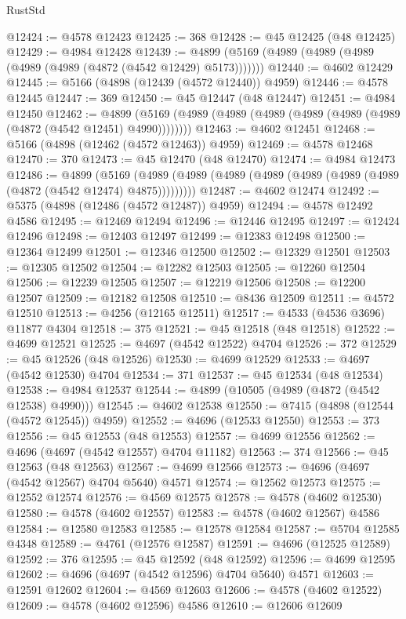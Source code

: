 \begin{lexlean}{RustStd}
\begin{coremodule}
@12424 := @4578 @12423
@12425 := 368
@12428 := @45 @12425 (@48 @12425)
@12429 := @4984 @12428
@12439 := @4899 (@5169 (@4989 (@4989 (@4989 (@4989 (@4989 (@4872 (@4542 @12429) @5173)))))))
@12440 := @4602 @12429
@12445 := @5166 (@4898 (@12439 (@4572 @12440)) @4959)
@12446 := @4578 @12445
@12447 := 369
@12450 := @45 @12447 (@48 @12447)
@12451 := @4984 @12450
@12462 := @4899 (@5169 (@4989 (@4989 (@4989 (@4989 (@4989 (@4989 (@4872 (@4542 @12451) @4990))))))))
@12463 := @4602 @12451
@12468 := @5166 (@4898 (@12462 (@4572 @12463)) @4959)
@12469 := @4578 @12468
@12470 := 370
@12473 := @45 @12470 (@48 @12470)
@12474 := @4984 @12473
@12486 := @4899
    (@5169 (@4989 (@4989 (@4989 (@4989 (@4989 (@4989 (@4989 (@4872 (@4542 @12474) @4875)))))))))
@12487 := @4602 @12474
@12492 := @5375 (@4898 (@12486 (@4572 @12487)) @4959)
@12494 := @4578 @12492 @4586
@12495 := @12469 @12494
@12496 := @12446 @12495
@12497 := @12424 @12496
@12498 := @12403 @12497
@12499 := @12383 @12498
@12500 := @12364 @12499
@12501 := @12346 @12500
@12502 := @12329 @12501
@12503 := @12305 @12502
@12504 := @12282 @12503
@12505 := @12260 @12504
@12506 := @12239 @12505
@12507 := @12219 @12506
@12508 := @12200 @12507
@12509 := @12182 @12508
@12510 := @8436 @12509
@12511 := @4572 @12510
@12513 := @4256 (@12165 @12511)
@12517 := @4533 (@4536 @3696) @11877 @4304
@12518 := 375
@12521 := @45 @12518 (@48 @12518)
@12522 := @4699 @12521
@12525 := @4697 (@4542 @12522) @4704
@12526 := 372
@12529 := @45 @12526 (@48 @12526)
@12530 := @4699 @12529
@12533 := @4697 (@4542 @12530) @4704
@12534 := 371
@12537 := @45 @12534 (@48 @12534)
@12538 := @4984 @12537
@12544 := @4899 (@10505 (@4989 (@4872 (@4542 @12538) @4990)))
@12545 := @4602 @12538
@12550 := @7415 (@4898 (@12544 (@4572 @12545)) @4959)
@12552 := @4696 (@12533 @12550)
@12553 := 373
@12556 := @45 @12553 (@48 @12553)
@12557 := @4699 @12556
@12562 := @4696 (@4697 (@4542 @12557) @4704 @11182)
@12563 := 374
@12566 := @45 @12563 (@48 @12563)
@12567 := @4699 @12566
@12573 := @4696 (@4697 (@4542 @12567) @4704 @5640) @4571
@12574 := @12562 @12573
@12575 := @12552 @12574
@12576 := @4569 @12575
@12578 := @4578 (@4602 @12530)
@12580 := @4578 (@4602 @12557)
@12583 := @4578 (@4602 @12567) @4586
@12584 := @12580 @12583
@12585 := @12578 @12584
@12587 := @5704 @12585 @4348
@12589 := @4761 (@12576 @12587)
@12591 := @4696 (@12525 @12589)
@12592 := 376
@12595 := @45 @12592 (@48 @12592)
@12596 := @4699 @12595
@12602 := @4696 (@4697 (@4542 @12596) @4704 @5640) @4571
@12603 := @12591 @12602
@12604 := @4569 @12603
@12606 := @4578 (@4602 @12522)
@12609 := @4578 (@4602 @12596) @4586
@12610 := @12606 @12609

\end{coremodule}
\end{lexlean}
